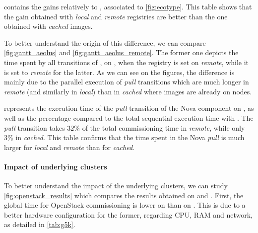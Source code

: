  contains the gains relatively to \ansass,
associated to \cref{fig:ecotype}. This table shows that the gain obtained with
\emph{local} and \emph{remote} registries are better than the one obtained with
\emph{cached} \docker images.

To better understand the origin of this difference, we can compare
\cref{fig:gantt_aeolus} and \cref{fig:gantt_aeolus_remote}. The former one
depicts the time spent by all transitions of \aeoass, on \ecotype, when the
\docker registry is set on \emph{remote}, while it is set to \emph{remote} for
the latter.
As we can see on the figures, the difference is mainly due to the parallel
execution of \emph{pull} transitions which are much longer in \emph{remote}
(and similarly in \emph{local}) than in \emph{cached} where images are already
on nodes.

 represents the execution time of the \emph{pull} transition of
the Nova component on \ecotype, as well as the percentage compared to the total
sequential execution time with \ansass. The \emph{pull} transition takes $32\%$
of the total commissioning time in \emph{remote}, while only $3\%$ in
\emph{cached}. This table confirms that the time spent in the Nova \emph{pull}
is much larger for \emph{local} and \emph{remote} than for \emph{cached}.


\paragraph{Impact of underlying clusters}

%
To better understand the impact of the underlying clusters, we can study
\cref{fig:openstack_results} which compares the results obtained on \ecotype and
\nova. First, the global time for OpenStack commissioning is lower on \ecotype
than on \nova. This is due to a better hardware configuration for the former,
regarding CPU, RAM and network, as detailed in \cref{tab:g5k}.

